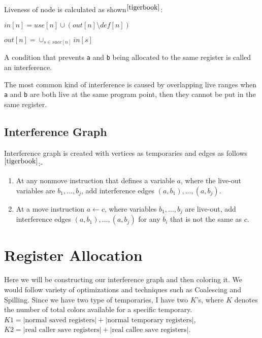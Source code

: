 Liveness of node is calculated as shown$^{\cite{tigerbook}}$:

\(in[n] = use[n] \cup (out[n] \setminus def[n])\)

\(out[n] = \cup_{s \in succ[n]} in[s]\)

A condition that prevents
\texttt{a} and
\texttt{b} being
allocated to the same register is called an interference.

The most common kind of interference is caused by overlapping live
ranges when
\texttt{a} and
\texttt{b} are
both live at the same program point, then they cannot be put in the same
register.

\hypertarget{interference-graph}{%
	\subsection{Interference Graph}\label{interference-graph}}

Interference graph is created with vertices as temporaries and edges as
follows$^{\cite{tigerbook}}$:-

\begin{enumerate}
	\def\labelenumi{\arabic{enumi}.}
	\item
	      At any nonmove instruction that defines a variable \(a\), where the
	      live-out variables are \(b_1, \dots, b_j\), add interference edges
	      \((a, b_1), \dots, (a, b_j)\).
	\item
	      At a move instruction \(a \leftarrow c\), where variables
	      \(b_1, \dots, b_j\) are live-out, add interference edges
	      \((a, b_1), \dots, (a, b_j)\) for any \(b_i\) that is not the same as
	      \(c\).
\end{enumerate}

\section{Register Allocation}


Here we will be constructing our interference graph and then coloring it. We would follow variety of optimizations and techniques such as Coalescing and Spilling. Since we have two type of temporaries, I have two $K$'s, where $K$ denotes the number of total colors available for a specific temporary. $K1 = |\text{normal saved registers}| + |\text{normal temporary registers}|$, $K2 = |\text{real caller save registers}| + |\text{real callee save registers}|$.


